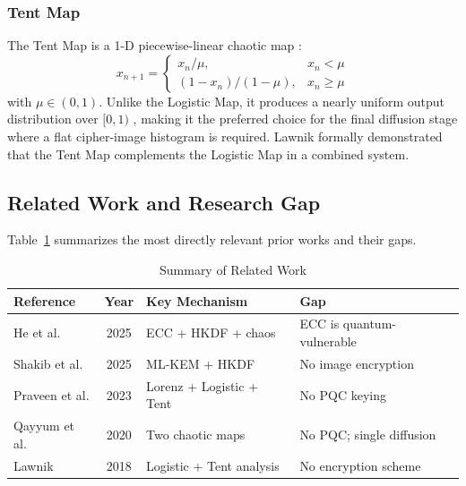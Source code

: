 \documentclass[conference]{IEEEtran}
\begin{document}
\subsubsection{Tent Map}
The Tent Map is a 1-D piecewise-linear chaotic map \cite{b9}:
\begin{equation}
	x_{n+1} = \begin{cases} x_n/\mu, & x_n < \mu \\ (1-x_n)/(1-\mu), & x_n \geq \mu \end{cases}
	\label{eq:tent_bg}
\end{equation}
with $\mu \in (0,1)$. Unlike the Logistic Map, it produces a nearly uniform output distribution over $[0,1)$ \cite{b25}, making it the preferred choice for the final diffusion stage where a flat cipher-image histogram is required. Lawnik \cite{b25} formally demonstrated that the Tent Map complements the Logistic Map in a combined system.

\subsection{Related Work and Research Gap}

Table~\ref{tab:related} summarizes the most directly relevant prior works and their gaps.

\begin{table}[htbp]
	\caption{Summary of Related Work}
	\label{tab:related}
	\begin{center}
		\begin{tabular}{|p{1.4cm}|c|p{2.0cm}|p{2.0cm}|}
			\hline
			\textbf{Reference} & \textbf{Year} & \textbf{Key Mechanism} & \textbf{Gap} \\
			\hline
			He et al. \cite{b20} & 2025 & ECC + HKDF + chaos & ECC is quantum-vulnerable \\
			\hline
			Shakib et al. \cite{b23} & 2025 & ML-KEM + HKDF & No image encryption \\
			\hline
			Praveen et al. \cite{b26,b29} & 2023 & Lorenz + Logistic + Tent & No PQC keying \\
			\hline
			Qayyum et al. \cite{b22} & 2020 & Two chaotic maps & No PQC; single diffusion \\
			\hline
			Lawnik \cite{b25} & 2018 & Logistic + Tent analysis & No encryption scheme \\
			\hline
		\end{tabular}
	\end{center}
\end{table}
\end{document}
